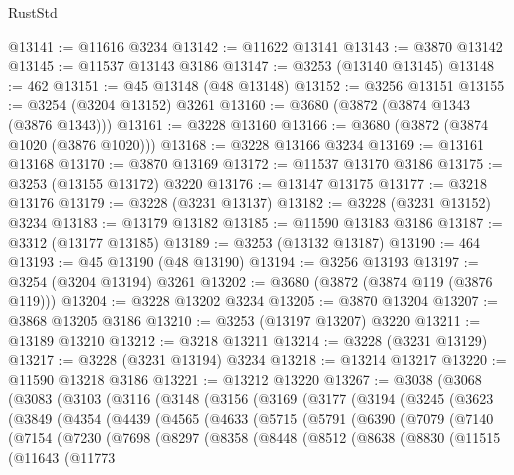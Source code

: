 \begin{lexlean}{RustStd}
\begin{coremodule}
@13141 := @11616 @3234
@13142 := @11622 @13141
@13143 := @3870 @13142
@13145 := @11537 @13143 @3186
@13147 := @3253 (@13140 @13145)
@13148 := 462
@13151 := @45 @13148 (@48 @13148)
@13152 := @3256 @13151
@13155 := @3254 (@3204 @13152) @3261
@13160 := @3680 (@3872 (@3874 @1343 (@3876 @1343)))
@13161 := @3228 @13160
@13166 := @3680 (@3872 (@3874 @1020 (@3876 @1020)))
@13168 := @3228 @13166 @3234
@13169 := @13161 @13168
@13170 := @3870 @13169
@13172 := @11537 @13170 @3186
@13175 := @3253 (@13155 @13172) @3220
@13176 := @13147 @13175
@13177 := @3218 @13176
@13179 := @3228 (@3231 @13137)
@13182 := @3228 (@3231 @13152) @3234
@13183 := @13179 @13182
@13185 := @11590 @13183 @3186
@13187 := @3312 (@13177 @13185)
@13189 := @3253 (@13132 @13187)
@13190 := 464
@13193 := @45 @13190 (@48 @13190)
@13194 := @3256 @13193
@13197 := @3254 (@3204 @13194) @3261
@13202 := @3680 (@3872 (@3874 @119 (@3876 @119)))
@13204 := @3228 @13202 @3234
@13205 := @3870 @13204
@13207 := @3868 @13205 @3186
@13210 := @3253 (@13197 @13207) @3220
@13211 := @13189 @13210
@13212 := @3218 @13211
@13214 := @3228 (@3231 @13129)
@13217 := @3228 (@3231 @13194) @3234
@13218 := @13214 @13217
@13220 := @11590 @13218 @3186
@13221 := @13212 @13220
@13267 := @3038
    (@3068
      (@3083
        (@3103
          (@3116
            (@3148
              (@3156
                (@3169
                  (@3177
                    (@3194
                      (@3245
                        (@3623
                          (@3849
                            (@4354
                              (@4439
                                (@4565
                                  (@4633
                                    (@5715
                                      (@5791
                                        (@6390
                                          (@7079
                                            (@7140
                                              (@7154
                                                (@7230
                                                  (@7698
                                                    (@8297
                                                      (@8358
                                                        (@8448
                                                          (@8512
                                                            (@8638
                                                              (@8830
                                                                (@11515
                                                                  (@11643
                                                                    (@11773

\end{coremodule}
\end{lexlean}

